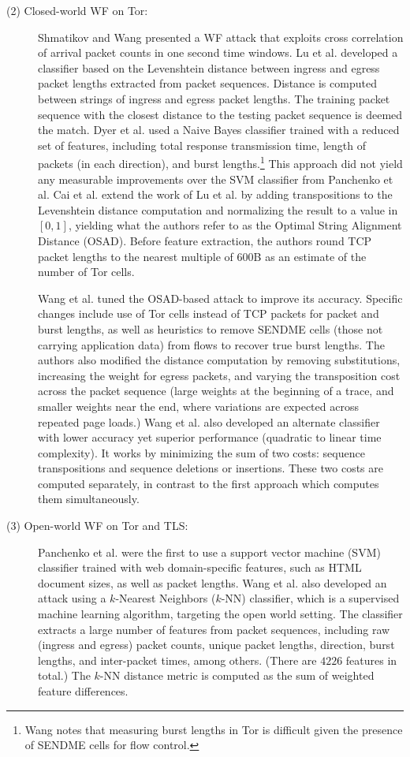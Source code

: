 \documentclass[runningheads]{llncs}
\begin{document}
\begin{description}
\item [(2) Closed-world WF on Tor:] Shmatikov and Wang \cite{shmatikov2006timing}
presented a WF attack that exploits cross correlation of arrival packet counts in
one second time windows.
Lu et al. \cite{lu2010website} developed a classifier based on the Levenshtein distance between
ingress and egress packet lengths extracted from packet sequences. Distance is computed between
strings of ingress and egress packet lengths. The training packet sequence with the closest
distance to the testing packet sequence is deemed the match. Dyer et al. \cite{dyer2012peek}
used a Naive Bayes classifier trained with a reduced set of features, including total
response transmission time, length of packets (in each direction), and burst lengths.\footnote{Wang
\cite{wang2016website} notes that measuring burst lengths in Tor is difficult given the presence of
SENDME cells for flow control.} This approach did not yield any measurable improvements over
the SVM classifier from Panchenko et al. Cai et al. \cite{cai2012touching} extend the work of Lu et al.
by adding transpositions to the Levenshtein distance computation and normalizing the result to
a value in $[0,1]$, yielding what the authors refer to as the Optimal String Alignment Distance
(OSAD). Before feature extraction, the authors round TCP packet lengths to the nearest multiple of
$600$B as an estimate of the number of Tor cells.

Wang et al. \cite{wang2013improved} tuned the OSAD-based attack to improve its accuracy. Specific changes
include use of Tor cells instead of TCP packets for packet and burst lengths, as well as heuristics
to remove SENDME cells (those not carrying application data) from flows to recover true
burst lengths. The authors also modified the distance computation by removing substitutions,
increasing the weight for egress packets, and varying the transposition cost across the packet
sequence (large weights at the beginning of a trace, and smaller weights near the end, where
variations are expected across repeated page loads.) Wang et al. also developed an alternate classifier
with lower accuracy yet superior performance (quadratic to linear time complexity). It works by
minimizing the sum of two costs: sequence transpositions and sequence deletions or insertions. These
two costs are computed separately, in contrast to the first approach which computes them simultaneously.

\item [(3) Open-world WF on Tor and TLS:] Panchenko et al. \cite{panchenko2011website}
were the first to use a support vector machine (SVM) classifier trained with web domain-specific
features, such as HTML document sizes, as well as packet lengths.
Wang et al. \cite{wang2014effective} also developed an attack using a $k$-Nearest Neighbors ($k$-NN) classifier,
which is a supervised machine learning algorithm, targeting the open world setting. The classifier
extracts a large number of features from packet sequences, including raw (ingress and egress)
packet counts, unique packet lengths, direction, burst lengths, and inter-packet times, among others.
(There are $4226$ features in total.) The $k$-NN distance metric is computed as the sum of weighted
feature differences.


\end{description}
\end{document}
